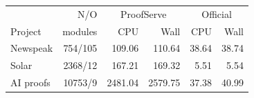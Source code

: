 \begin{tabular}{lrrrrr}
\toprule
& N/O & \multicolumn{2}{c}{ProofServe} & \multicolumn{2}{c}{Official}\\
Project & modules & CPU & Wall & CPU & Wall\\
\midrule
Newspeak & 754/105 & 109.06 & 110.64 & 38.64 & 38.74\\
Solar & 2368/12 & 167.21 & 169.32 & 5.51 & 5.54\\
AI proofs & 10753/9 & 2481.04 & 2579.75 & 37.38 & 40.99\\
\bottomrule
\end{tabular}
